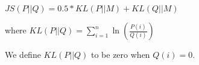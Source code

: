 \begin{center}
$JS(P||Q) = 0.5 * KL(P||M) + KL(Q||M)$

where $KL(P||Q) = \sum\limits_{i=1}^n \ln(\frac{P(i)}{Q(i)})$
\end{center}
We define $KL(P||Q)$ to be zero when $Q(i)=0$.



